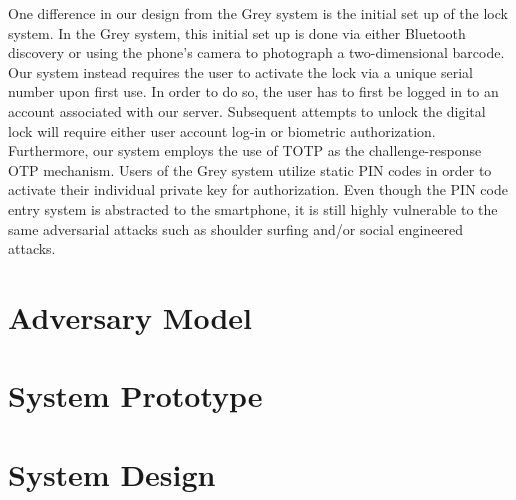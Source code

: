 \documentclass[conference]{IEEEtran}
\begin{document}
	One difference in our design from the Grey system is the initial set up of the lock system. In the Grey system, this initial set up is done via either Bluetooth discovery or using the phone’s camera to photograph a two-dimensional barcode. Our system instead requires the user to activate the lock via a unique serial number upon first use. In order to do so, the user has to first be logged in to an account associated with our server. Subsequent attempts to unlock the digital lock will require either user account log-in or biometric authorization. Furthermore, our system employs the use of TOTP as the challenge-response OTP mechanism. Users of the Grey system utilize static PIN codes in order to activate their individual private key for authorization. Even though the PIN code entry system is abstracted to the smartphone, it is still highly vulnerable to the same adversarial attacks such as shoulder surfing and/or social engineered attacks.

\section{Adversary Model}

\section{System Prototype}
\section{System Design}
\end{document}
